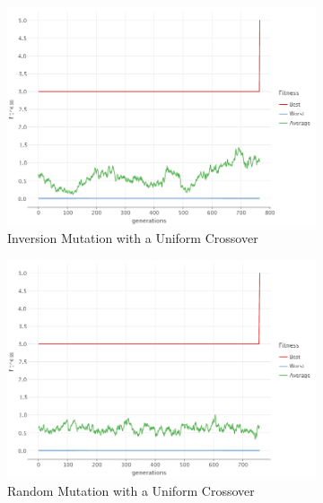     \begin{figure}[ht!]
        \centering
        \begin{subfigure}{0.35\textwidth}
            \includegraphics[width=\textwidth]{img/beacon_uniform_inv_2.png}
            \caption{Inversion Mutation with a Uniform Crossover}
            \label{fig:beacon:4:inversion}
        \end{subfigure}
        \hfill
        \begin{subfigure}{0.35\textwidth}
            \includegraphics[width=\textwidth]{img/beacon_uniform_random_2.png}
            \caption{Random Mutation with a Uniform Crossover}
            \label{fig:beacon:4:random}
        \end{subfigure}
        \begin{subfigure}{0.35\textwidth}

\end{subfigure}
\end{figure}
